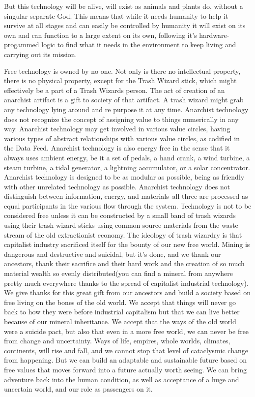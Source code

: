 But this technology will be alive, will exist as animals and plants do,
without a singular separate God. This means that while it needs humanity
to help it survive at all stages and can easily be controlled by
humanity it will exist on its own and can function to a large extent on
its own, following it's hardware-progammed logic to find what it needs
in the environment to keep living and carrying out its mission.

Free technology is owned by no one. Not only is there no intellectual
property, there is no physical property, except for the Trash Wizard
stick, which might effectively be a part of a Trash Wizards person. The
act of creation of an anarchist artifact is a gift to society of that
artifact. A trash wizard might grab any technology lying around and re
purpose it at any time. Anarchist technology does not recognize the
concept of assigning value to things numerically in any way. Anarchist
technology may get involved in various value circles, having various
types of abstract relationships with various value circles, as codified
in the Data Feed. Anarchist technology is also energy free in the sense
that it always uses ambient energy, be it a set of pedals, a hand crank,
a wind turbine, a steam turbine, a tidal generator, a lightning
accumulator, or a solar concentrator. Anarchist technology is designed
to be as modular as possible, being as friendly with other unrelated
technology as possible. Anarchist technology does not distinguish
between information, energy, and materials--all three are processed as
equal participants in the various flow through the system. Technology is
not to be considered free unless it can be constructed by a small band
of trash wizards using their trash wizard sticks using common source
materials from the waste stream of the old extractionist economy. The
ideology of trash wizardry is that capitalist industry sacrificed itself
for the bounty of our new free world. Mining is dangerous and
destructive and suicidal, but it's done, and we thank our ancestors,
thank their sacrifice and their hard work and the creation of so much
material wealth so evenly distributed(you can find a mineral from
anywhere pretty much everywhere thanks to the spread of capitalist
industrial technology). We give thanks for this great gift from our
ancestors and build a society based on free living on the bones of the
old world. We accept that things will never go back to how they were
before industrial capitalism but that we can live better because of our
mineral inheritance. We accept that the ways of the old world were a
suicide pact, but also that even in a more free world, we can never be
free from change and uncertainty. Ways of life, empires, whole worlds,
climates, continents, will rise and fall, and we cannot stop that level
of cataclysmic change from happening. But we can build an adaptable and
sustainable future based on free values that moves forward into a future
actually worth seeing. We can bring adventure back into the human
condition, as well as acceptance of a huge and uncertain world, and our
role as passengers on it.

